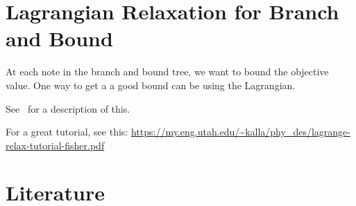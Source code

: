 \documentclass[../open-optimization/open-optimization.tex]{subfiles}
\begin{document}
\section{Lagrangian Relaxation for Branch and Bound}

At each note in the branch and bound tree, we want to bound the objective value.  One way to get a a good bound can be using the Lagrangian. 

See~\cite{Fisher2004} for a description of this.

For a great tutorial, see this: 
 \url{https://my.eng.utah.edu/~kalla/phy_des/lagrange-relax-tutorial-fisher.pdf}


\section{Literature}
\end{document}
